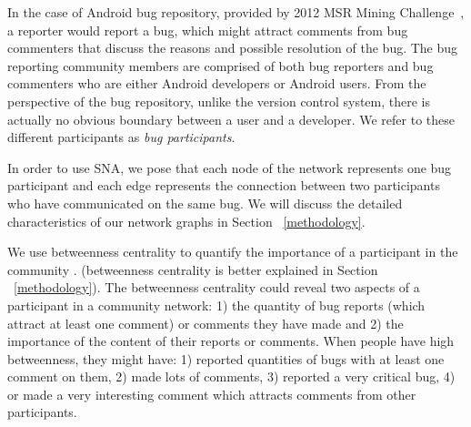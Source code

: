 \documentclass[10pt, conference, compsocconf]{IEEEtran}
\begin{document}

In the case of Android bug repository, provided by 2012 MSR
Mining Challenge~\cite{DATA:msr}, a reporter would report a bug, which
might attract comments from bug commenters that discuss the reasons
and possible resolution of the bug.
The bug reporting community members are comprised of both bug
reporters and bug commenters who are either Android developers or
Android users.
From the perspective of the bug repository, unlike the version control
system, there is actually no
obvious boundary between a user and a developer.
We refer to these different participants as \emph{bug participants}.

In order to use SNA, we pose that each node of the network represents
one bug participant and each edge represents the connection between
two participants who have communicated on the same bug. 
We will discuss the detailed characteristics of our network graphs in
Section ~\ref{methodology}.

We use betweenness centrality to quantify the importance of a
participant in the community \cite{ICSEsocio:la}. 
(betweenness centrality is better explained in 
 Section ~\ref{methodology}).
The betweenness centrality could reveal two aspects of a participant
in a community network: 1) the quantity of bug reports (which attract
at least one comment) or comments they have made and 2) the importance
of the content of their reports or comments. 
When people have high betweenness, they might have: 1) reported
quantities of bugs with at least one comment on them, 2) made lots of
comments, 3) reported a very critical bug, 4) or made a very
interesting comment which attracts comments from other participants.


\end{document}
